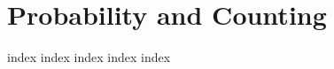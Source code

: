 \chapter{Probability and Counting}
\label{ch:pac}
\ifdefined\HCode
\else
{
\startcontents[chapter]
}
\fi

{index}
{index}
{index}
{index}
{index}

\ifdefined\HCode
{}
\fi

\ifdefined\HCode
\else
{
\stopcontents[chapter]
}
\fi